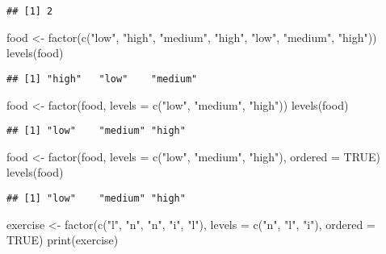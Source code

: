 \documentclass[
]{article}
\newenvironment{Shaded}{\begin{snugshade}}{\end{snugshade}}
\newcommand{\AttributeTok}[1]{\textcolor[rgb]{0.77,0.63,0.00}{#1}}
\newcommand{\ConstantTok}[1]{\textcolor[rgb]{0.00,0.00,0.00}{#1}}
\newcommand{\FunctionTok}[1]{\textcolor[rgb]{0.00,0.00,0.00}{#1}}
\newcommand{\NormalTok}[1]{#1}
\newcommand{\OtherTok}[1]{\textcolor[rgb]{0.56,0.35,0.01}{#1}}
\newcommand{\StringTok}[1]{\textcolor[rgb]{0.31,0.60,0.02}{#1}}
\begin{document}
\begin{verbatim}
## [1] 2
\end{verbatim}

\begin{Shaded}
\begin{Highlighting}[]
\NormalTok{food }\OtherTok{\textless{}{-}} \FunctionTok{factor}\NormalTok{(}\FunctionTok{c}\NormalTok{(}\StringTok{"low"}\NormalTok{, }\StringTok{"high"}\NormalTok{, }\StringTok{"medium"}\NormalTok{, }\StringTok{"high"}\NormalTok{, }\StringTok{"low"}\NormalTok{, }\StringTok{"medium"}\NormalTok{, }\StringTok{"high"}\NormalTok{))}
\FunctionTok{levels}\NormalTok{(food)}
\end{Highlighting}
\end{Shaded}

\begin{verbatim}
## [1] "high"   "low"    "medium"
\end{verbatim}

\begin{Shaded}
\begin{Highlighting}[]
\NormalTok{food }\OtherTok{\textless{}{-}} \FunctionTok{factor}\NormalTok{(food, }\AttributeTok{levels =} \FunctionTok{c}\NormalTok{(}\StringTok{"low"}\NormalTok{, }\StringTok{"medium"}\NormalTok{, }\StringTok{"high"}\NormalTok{))}
\FunctionTok{levels}\NormalTok{(food)}
\end{Highlighting}
\end{Shaded}

\begin{verbatim}
## [1] "low"    "medium" "high"
\end{verbatim}

\begin{Shaded}
\begin{Highlighting}[]
\NormalTok{food }\OtherTok{\textless{}{-}} \FunctionTok{factor}\NormalTok{(food, }\AttributeTok{levels =} \FunctionTok{c}\NormalTok{(}\StringTok{"low"}\NormalTok{, }\StringTok{"medium"}\NormalTok{, }\StringTok{"high"}\NormalTok{), }\AttributeTok{ordered =} \ConstantTok{TRUE}\NormalTok{)}
\FunctionTok{levels}\NormalTok{(food)}
\end{Highlighting}
\end{Shaded}

\begin{verbatim}
## [1] "low"    "medium" "high"
\end{verbatim}

\begin{Shaded}
\begin{Highlighting}[]
\NormalTok{exercise }\OtherTok{\textless{}{-}} \FunctionTok{factor}\NormalTok{(}\FunctionTok{c}\NormalTok{(}\StringTok{"l"}\NormalTok{, }\StringTok{"n"}\NormalTok{, }\StringTok{"n"}\NormalTok{, }\StringTok{"i"}\NormalTok{, }\StringTok{"l"}\NormalTok{), }\AttributeTok{levels =} \FunctionTok{c}\NormalTok{(}\StringTok{"n"}\NormalTok{, }\StringTok{"l"}\NormalTok{, }\StringTok{"i"}\NormalTok{), }\AttributeTok{ordered =} \ConstantTok{TRUE}\NormalTok{)}
\FunctionTok{print}\NormalTok{(exercise)}
\end{Highlighting}
\end{Shaded}
\end{document}

